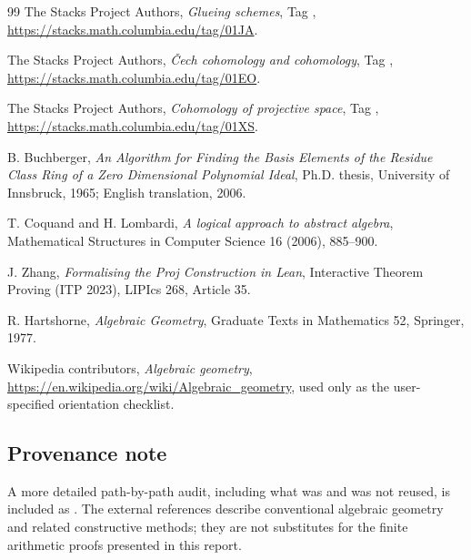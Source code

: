 \begin{thebibliography}{99}
The Stacks Project Authors,
\emph{Glueing schemes}, Tag ,
\url{https://stacks.math.columbia.edu/tag/01JA}.

The Stacks Project Authors,
\emph{\v{C}ech cohomology and cohomology}, Tag ,
\url{https://stacks.math.columbia.edu/tag/01EO}.

The Stacks Project Authors,
\emph{Cohomology of projective space}, Tag ,
\url{https://stacks.math.columbia.edu/tag/01XS}.

B. Buchberger,
\emph{An Algorithm for Finding the Basis Elements of the Residue Class Ring of a
Zero Dimensional Polynomial Ideal},
Ph.D. thesis, University of Innsbruck, 1965; English translation, 2006.

T. Coquand and H. Lombardi,
\emph{A logical approach to abstract algebra},
Mathematical Structures in Computer Science 16 (2006), 885--900.

J. Zhang,
\emph{Formalising the Proj Construction in Lean},
Interactive Theorem Proving (ITP 2023), LIPIcs 268, Article 35.

R. Hartshorne,
\emph{Algebraic Geometry},
Graduate Texts in Mathematics 52, Springer, 1977.

Wikipedia contributors,
\emph{Algebraic geometry},
\url{https://en.wikipedia.org/wiki/Algebraic_geometry},
used only as the user-specified orientation checklist.

\end{thebibliography}

\subsection*{Provenance note}

A more detailed path-by-path audit, including what was and was not reused, is included as
.  The external references describe conventional algebraic
geometry and related constructive methods; they are not substitutes for the finite arithmetic
proofs presented in this report.
